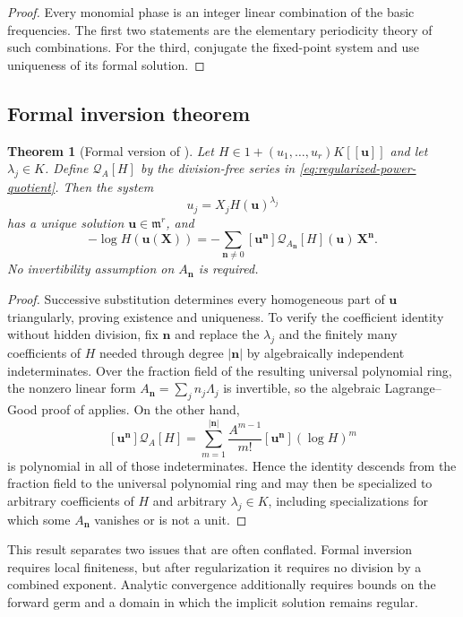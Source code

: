 \documentclass[11pt,oneside]{article}
\theoremstyle{plain}
\newtheorem{theorem}{Theorem}[section]
\theoremstyle{definition}
\theoremstyle{remark}
\newcommand{\abs}[1]{\left\lvert#1\right\rvert}
\begin{document}
\begin{proof}
Every monomial phase is an integer linear combination of the basic
frequencies.  The first two statements are the elementary periodicity theory
of such combinations.  For the third, conjugate the fixed-point system and use
uniqueness of its formal solution.
\end{proof}

\subsection{Formal inversion theorem}

\begin{theorem}[Formal version of ]
\label{thm:formal-universal}
Let \(H\in1+(u_1,\ldots,u_r)K[[\bm u]]\) and let
\(\lambda_j\in K\).  Define \(\mathscr Q_A[H]\) by the division-free series
in \eqref{eq:regularized-power-quotient}.  Then the system
\[
 u_j=X_jH(\bm u)^{\lambda_j}
\]
has a unique solution \(\bm u\in\mathfrak m^r\), and
\[
 -\log H(\bm u(\bm X))
 =-\sum_{\bm n\ne0}
 [\bm u^{\bm n}]\mathscr Q_{A_{\bm n}}[H](\bm u)\,
 \bm X^{\bm n}.
\]
No invertibility assumption on \(A_{\bm n}\) is required.
\end{theorem}

\begin{proof}
Successive substitution determines every homogeneous part of \(\bm u\)
triangularly, proving existence and uniqueness.  To verify the coefficient
identity without hidden division, fix \(\bm n\) and replace the \(\lambda_j\)
and the finitely many coefficients of \(H\) needed through degree
\(\abs{\bm n}\) by algebraically independent indeterminates.  Over the
fraction field of the resulting universal polynomial ring, the nonzero linear
form \(A_{\bm n}=\sum_jn_j\Lambda_j\) is invertible, so the algebraic
Lagrange--Good proof of  applies.  On the other
hand,
\[
 [\bm u^{\bm n}]\mathscr Q_A[H]
 =\sum_{m=1}^{\abs{\bm n}}
 \frac{A^{m-1}}{m!}
 [\bm u^{\bm n}](\log H)^m
\]
is polynomial in all of those indeterminates.  Hence the identity descends from
the fraction field to the universal polynomial ring and may then be
specialized to arbitrary coefficients of \(H\) and arbitrary
\(\lambda_j\in K\), including specializations for which some
\(A_{\bm n}\) vanishes or is not a unit.
\end{proof}

This result separates two issues that are often conflated.  Formal inversion
requires local finiteness, but after regularization it requires no division by
a combined exponent.  Analytic convergence additionally requires bounds on
the forward germ and a domain in which the implicit solution remains regular.
\end{document}
